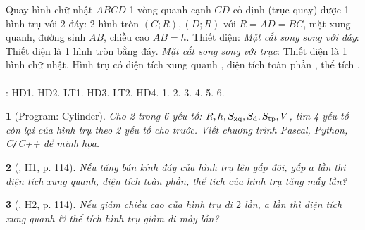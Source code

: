 \documentclass{article}
\newtheorem{baitoan}{}
\begin{document}
\begin{center}
\end{center}
 Quay hình chữ nhật $ABCD$ 1 vòng quanh cạnh $CD$ cố định (trục quay) được 1 hình trụ với 2 đáy: 2 hình tròn $(C;R),(D;R)$ với $R = AD = BC$, mặt xung quanh, đường sinh $AB$, chiều cao $AB = h$.  {\sf Thiết diện}: {\it Mặt cắt song song với đáy}: Thiết diện là 1 hình tròn bằng đáy. {\it Mặt cắt song song với trục}: Thiết diện là 1 hình chữ nhật.  Hình trụ có diện tích xung quanh , diện tích toàn phần , thể tích .\\
\\
\cite[Chap. X, \S1, pp. 92--97]{SGK_Toan_9_Canh_Dieu_tap_1}: HD1. HD2. LT1. HD3. LT2. HD4. 1. 2. 3. 4. 5. 6.

\begin{baitoan}[{\sf Program}: Cylinder]
	Cho 2 trong 6 yếu tố: $R,h,S_{\rm xq},S_{\scriptsize\mbox{\rm đ}},S_{\rm tp},V$, tìm 4 yếu tố còn lại của hình trụ theo 2 yếu tố cho trước. Viết chương trình {\sf Pascal, Python, C{\tt/}C++} để minh họa.
\end{baitoan}

\begin{baitoan}[\cite{Binh_boi_duong_Toan_9_tap_2}, H1, p. 114]
	Nếu tăng bán kính đáy của hình trụ lên gấp đôi, gấp $a$ lần thì diện tích xung quanh, diện tích toàn phần, thể tích của hình trụ tăng mấy lần?
\end{baitoan}

\begin{baitoan}[\cite{Binh_boi_duong_Toan_9_tap_2}, H2, p. 114]
	Nếu giảm chiều cao của hình trụ đi $2$ lần, a lần thì diện tích xung quanh \& thể tích hình trụ giảm đi mấy lần?
\end{baitoan}
\end{document}

